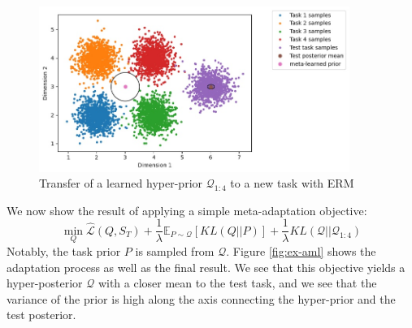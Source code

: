 \documentclass{article}
\theoremstyle{definition}
\newcommand{\Expect}[2]{\mathbb{E}_{#1}\left [#2 \right ]}
\begin{document}
\begin{figure}
	\centering
	\includegraphics[width=0.9\textwidth]{toy_example_erm.JPG}
	\caption{Transfer of a learned hyper-prior $\mathcal{Q}_{1:4}$ to a new task with ERM}
	\label{fig:ex-erm}
\end{figure}


We now show the result of applying a simple meta-adaptation objective: 
$$\min_{Q}\hat{\mathcal{L}}(Q, S_T) + \frac{1}{\lambda}\Expect{P\sim \mathcal{Q}}{KL(Q||P)}+\frac{1}{\lambda}KL(\mathcal{Q}||\mathcal{Q}_{1:4})$$
Notably, the task prior $P$ is sampled from $\mathcal{Q}$. Figure \ref{fig:ex-aml} shows the adaptation process as well as the final result. We see that this objective yields a hyper-posterior $\mathcal{Q}$ with a closer mean to the test task, and we see that the variance of the prior is high along the axis connecting the hyper-prior and the test posterior. 
\end{document}
